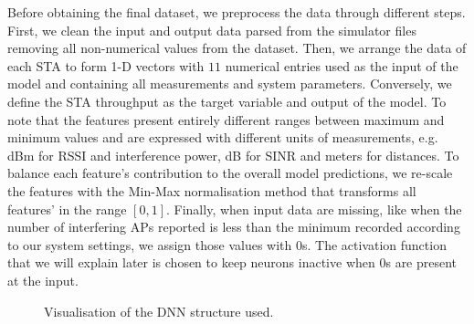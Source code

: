 \documentclass[10pt,conference ]{IEEEtran}
\begin{document}
Before obtaining the final dataset, we preprocess the data through different steps. 
First, we clean the input and output data parsed from the simulator files removing all non-numerical values from the dataset.
Then, we arrange the data of each \ac{STA} to form 1-D vectors with $11$ numerical entries used as the input of the model and containing all measurements and system parameters. 
Conversely, we define the \ac{STA} throughput as the target variable and output of the model. 
To note that the features present entirely different ranges between maximum and minimum values and are expressed with different units of measurements, e.g. dBm for \ac{RSSI} and interference power, dB for \ac{SINR} and meters for distances. 
To balance each feature's contribution to the overall model predictions, we re-scale the features with the Min-Max normalisation method that transforms all features' in the range $[0,1]$. 
Finally, when input data are missing, like when the number of interfering \acp{AP} reported is less than the minimum recorded according to our system settings, we assign those values with $0$s. 
The activation function that we will explain later is chosen to keep neurons inactive when $0$s are present at the input. 

\begin{figure}[t]
	\centering
	
	\caption{Visualisation of the DNN structure used.}
	\label{fig:DNN model}
\end{figure}
\end{document}
